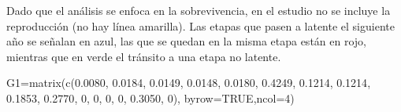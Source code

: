 \documentclass[
  12pt,
  letterpaper,
]{book}
\newenvironment{Shaded}{\begin{snugshade}}{\end{snugshade}}
\newcommand{\AttributeTok}[1]{\textcolor[rgb]{0.40,0.45,0.13}{#1}}
\newcommand{\ConstantTok}[1]{\textcolor[rgb]{0.56,0.35,0.01}{#1}}
\newcommand{\DecValTok}[1]{\textcolor[rgb]{0.68,0.00,0.00}{#1}}
\newcommand{\FloatTok}[1]{\textcolor[rgb]{0.68,0.00,0.00}{#1}}
\newcommand{\FunctionTok}[1]{\textcolor[rgb]{0.28,0.35,0.67}{#1}}
\newcommand{\NormalTok}[1]{\textcolor[rgb]{0.00,0.23,0.31}{#1}}
\newcommand{\OtherTok}[1]{\textcolor[rgb]{0.00,0.23,0.31}{#1}}
\begin{document}
Dado que el análisis se enfoca en la sobrevivencia, en el estudio no se
incluye la reproducción (no hay línea amarilla). Las etapas que pasen a
latente el siguiente año se señalan en azul, las que se quedan en la
misma etapa están en rojo, mientras que en verde el tránsito a una etapa
no latente.

\begin{Shaded}
\begin{Highlighting}[]
\NormalTok{G1}\OtherTok{=}\FunctionTok{matrix}\NormalTok{(}\FunctionTok{c}\NormalTok{(}\FloatTok{0.0080}\NormalTok{, }\FloatTok{0.0184}\NormalTok{,   }\FloatTok{0.0149}\NormalTok{, }\FloatTok{0.0148}\NormalTok{,}
            \FloatTok{0.0180}\NormalTok{,  }\FloatTok{0.4249}\NormalTok{,  }\FloatTok{0.1214}\NormalTok{, }\FloatTok{0.1214}\NormalTok{,}
            \FloatTok{0.1853}\NormalTok{,  }\FloatTok{0.2770}\NormalTok{,  }\DecValTok{0}\NormalTok{,      }\DecValTok{0}\NormalTok{,}
            \DecValTok{0}\NormalTok{,       }\DecValTok{0}\NormalTok{,       }\FloatTok{0.3050}\NormalTok{, }\DecValTok{0}\NormalTok{), }\AttributeTok{byrow=}\ConstantTok{TRUE}\NormalTok{,}\AttributeTok{ncol=}\DecValTok{4}\NormalTok{)}



\end{Highlighting}
\end{Shaded}
\end{document}
